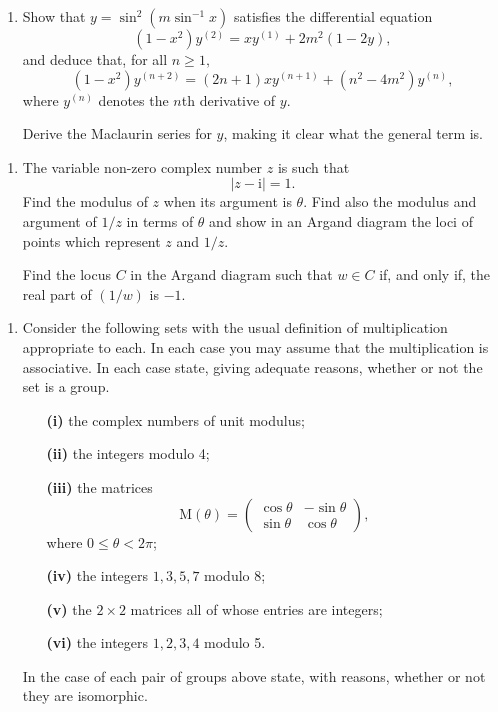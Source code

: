 \documentclass[a4, 11pt]{report}
\newlength{\qspace}
\newcounter{qnumber}
\newenvironment{question}%
 {\vspace{\qspace}
  \begin{enumerate}[\bfseries 1\quad][10]%
    \setcounter{enumi}{\value{qnumber}}%
    \item%
 }
{
  \end{enumerate}
  \filbreak
  \stepcounter{qnumber}
 }
\begin{document}
\begin{question}
Show that $y=\sin^{2}(m\sin^{-1}x)$ satisfies the differential equation
\[
(1-x^{2})y^{(2)}=xy^{(1)}+2m^{2}(1-2y),
\]
and deduce that, for all $n\geqslant1,$ 
\[
(1-x^{2})y^{(n+2)}=(2n+1)xy^{(n+1)}+(n^{2}-4m^{2})y^{(n)},
\]
where $y^{(n)}$ denotes the $n$th derivative of $y$. 


Derive the Maclaurin series for $y$, making it clear what the general
term is. 
	\end{question}
	
\begin{question}
The variable non-zero complex number $z$ is such that 
\[
\left|z-\mathrm{i}\right|=1.
\]
Find the modulus of $z$ when its argument is $\theta.$ Find also
the modulus and argument of $1/z$ in terms of $\theta$ and show
in an Argand diagram the loci of points which represent $z$ and $1/z$. 


Find the locus $C$ in the Argand diagram such that $w\in C$ if,
and only if, the real part of $(1/w)$ is $-1$. 
\end{question}
	
\begin{question}
Consider the following sets with the usual definition of multiplication
appropriate to each. In each case you may assume that the multiplication
is associative. In each case state, giving adequate reasons, whether
or not the set is a group. 

\begin{itemize}
\setlength{\itemsep}{3mm}

\item[\bf (i)] the complex numbers of unit modulus; 
\item[\bf (ii)] the integers modulo 4; 
\item[\bf (iii)] the matrices 
\[
\mathrm{M}(\theta)=\begin{pmatrix}\cos\theta & -\sin\theta\\
\sin\theta & \cos\theta
\end{pmatrix},
\]
where $0\leqslant\theta<2\pi$; 
\item[\bf (iv)] the integers $1,3,5,7$ modulo 8; 
\item[\bf (v)] the $2\times2$ matrices all of whose entries are integers; 
\item[\bf (vi)] the integers $1,2,3,4$ modulo 5. 
\end{itemize}

In the case of each pair of groups above state, with reasons, whether
or not they are isomorphic. 

\end{question}
		
\end{document}
